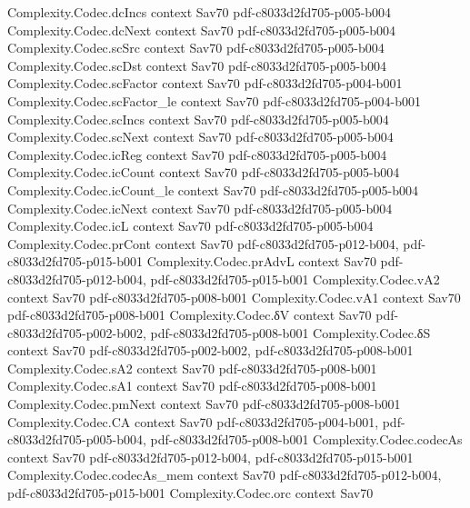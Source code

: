 \begin{theorem}
\proofstep
  {Complexity.Codec.dcIncs}
  {context}
  {Sav70}
  {pdf-c8033d2fd705-p005-b004}
\proofstep
  {Complexity.Codec.dcNext}
  {context}
  {Sav70}
  {pdf-c8033d2fd705-p005-b004}
\proofstep
  {Complexity.Codec.scSrc}
  {context}
  {Sav70}
  {pdf-c8033d2fd705-p005-b004}
\proofstep
  {Complexity.Codec.scDst}
  {context}
  {Sav70}
  {pdf-c8033d2fd705-p005-b004}
\proofstep
  {Complexity.Codec.scFactor}
  {context}
  {Sav70}
  {pdf-c8033d2fd705-p004-b001}
\proofstep
  {Complexity.Codec.scFactor_le}
  {context}
  {Sav70}
  {pdf-c8033d2fd705-p004-b001}
\proofstep
  {Complexity.Codec.scIncs}
  {context}
  {Sav70}
  {pdf-c8033d2fd705-p005-b004}
\proofstep
  {Complexity.Codec.scNext}
  {context}
  {Sav70}
  {pdf-c8033d2fd705-p005-b004}
\proofstep
  {Complexity.Codec.icReg}
  {context}
  {Sav70}
  {pdf-c8033d2fd705-p005-b004}
\proofstep
  {Complexity.Codec.icCount}
  {context}
  {Sav70}
  {pdf-c8033d2fd705-p005-b004}
\proofstep
  {Complexity.Codec.icCount_le}
  {context}
  {Sav70}
  {pdf-c8033d2fd705-p005-b004}
\proofstep
  {Complexity.Codec.icNext}
  {context}
  {Sav70}
  {pdf-c8033d2fd705-p005-b004}
\proofstep
  {Complexity.Codec.icL}
  {context}
  {Sav70}
  {pdf-c8033d2fd705-p005-b004}
\proofstep
  {Complexity.Codec.prCont}
  {context}
  {Sav70}
  {pdf-c8033d2fd705-p012-b004,
    pdf-c8033d2fd705-p015-b001}
\proofstep
  {Complexity.Codec.prAdvL}
  {context}
  {Sav70}
  {pdf-c8033d2fd705-p012-b004,
    pdf-c8033d2fd705-p015-b001}
\proofstep
  {Complexity.Codec.vA2}
  {context}
  {Sav70}
  {pdf-c8033d2fd705-p008-b001}
\proofstep
  {Complexity.Codec.vA1}
  {context}
  {Sav70}
  {pdf-c8033d2fd705-p008-b001}
\proofstep
  {Complexity.Codec.δV}
  {context}
  {Sav70}
  {pdf-c8033d2fd705-p002-b002,
    pdf-c8033d2fd705-p008-b001}
\proofstep
  {Complexity.Codec.δS}
  {context}
  {Sav70}
  {pdf-c8033d2fd705-p002-b002,
    pdf-c8033d2fd705-p008-b001}
\proofstep
  {Complexity.Codec.sA2}
  {context}
  {Sav70}
  {pdf-c8033d2fd705-p008-b001}
\proofstep
  {Complexity.Codec.sA1}
  {context}
  {Sav70}
  {pdf-c8033d2fd705-p008-b001}
\proofstep
  {Complexity.Codec.pmNext}
  {context}
  {Sav70}
  {pdf-c8033d2fd705-p008-b001}
\proofstep
  {Complexity.Codec.CA}
  {context}
  {Sav70}
  {pdf-c8033d2fd705-p004-b001,
    pdf-c8033d2fd705-p005-b004,
    pdf-c8033d2fd705-p008-b001}
\proofstep
  {Complexity.Codec.codecAs}
  {context}
  {Sav70}
  {pdf-c8033d2fd705-p012-b004,
    pdf-c8033d2fd705-p015-b001}
\proofstep
  {Complexity.Codec.codecAs_mem}
  {context}
  {Sav70}
  {pdf-c8033d2fd705-p012-b004,
    pdf-c8033d2fd705-p015-b001}
\proofstep
  {Complexity.Codec.orc}
  {context}
  {Sav70}

\end{theorem}
